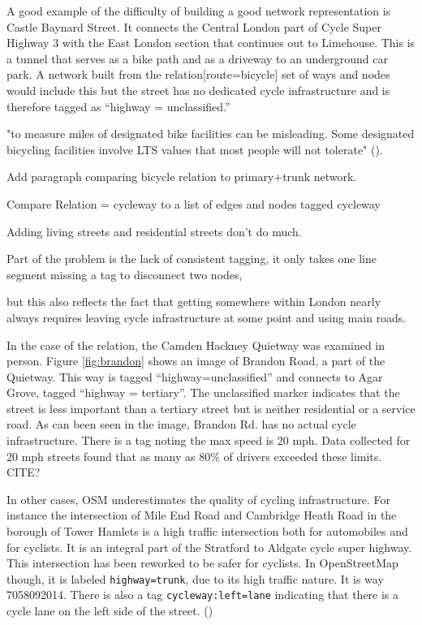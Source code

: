 A good example of the difficulty of building a good network representation is Castle Baynard Street. It connects the Central London part of Cycle Super Highway 3 with the East London section that continues out to Limehouse. This is a tunnel that serves as a bike path and as a driveway to an underground car park. A network built from the relation[route=bicycle] set of ways and nodes would include this but the street has no dedicated cycle infrastructure and is therefore tagged as ``highway = unclassified.'' 

"to measure miles of designated bike facilities can be misleading. Some designated bicycling facilities involve LTS values that most people will not tolerate" (\cite{furth2016network}).

Add paragraph comparing bicycle relation to primary+trunk network. 

Compare Relation = cycleway to a list of edges and nodes tagged cycleway

Adding living streets and residential streets don't do much. 

Part of the problem is the lack of consistent tagging, it only takes one line segment missing a tag to disconnect two nodes,

but this also reflects the fact that getting somewhere within London nearly always requires leaving cycle infrastructure at some point and using main roads.

In the case of the relation, the Camden Hackney Quietway was examined in person. Figure \ref{fig:brandon} shows an image of Brandon Road, a part of the Quietway. This way is tagged ``highway=unclassified'' and connects to Agar Grove, tagged ``highway = tertiary''. The unclassified marker indicates that the street is less important than a tertiary street but is neither residential or a service road. As can been seen in the image, Brandon Rd. has no actual cycle infrastructure. There is a tag noting the max speed is 20 mph. Data collected for 20 mph streets found that as many as 80\% of drivers exceeded these limits. CITE?

In other cases, OSM underestimates the quality of cycling infrastructure. For instance the intersection of Mile End Road and Cambridge Heath Road in the borough of Tower Hamlets is a high traffic intersection both for automobiles and for cyclists. It is an integral part of the Stratford to Aldgate cycle super highway. This intersection has been reworked to be safer for cyclists. In OpenStreetMap though, it is labeled \texttt{highway=trunk}, due to its high traffic nature. It is way 7058092014. There is also a tag \texttt{cycleway:left=lane} indicating that there is a cycle lane on the left side of the street. (\cite{osm})


